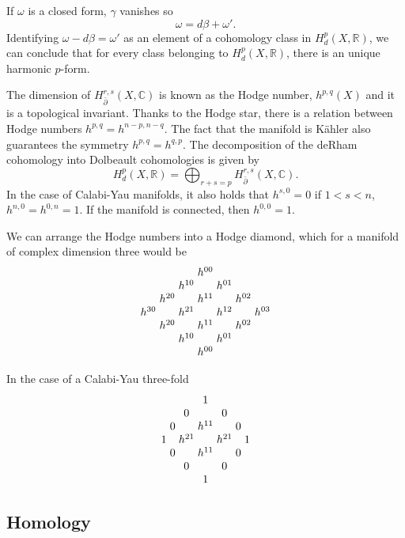 If $\omega$ is a closed form, $\gamma$ vanishes so
\begin{equation}
  \omega = d\beta + \omega'.
\end{equation}
Identifying $\omega - d\beta= \omega'$ as an element of a cohomology class in $H_d^p(X,\mathbb R)$,
we can conclude that for every class belonging to $H_d^p(X,\mathbb R)$, there is an unique
harmonic $p$-form.

The dimension of $H^{r,s}_{\bar \partial }(X,\mathbb C)$ is known as the Hodge number, $h^{p,q}(X)$ and it is a topological invariant.
Thanks to the Hodge star, there is a relation between Hodge numbers $h^{p,q}=h^{n-p,n-q}$.
The fact that the manifold is Kähler also guarantees the symmetry $h^{p,q}=h^{q,p}$.
The decomposition of the deRham cohomology into Dolbeault cohomologies is given by
\begin{equation}
  H_d^p(X,\mathbb R)=\bigoplus_{r+s=p} H_{\bar \partial}^{r,s}(X,\mathbb C).
\end{equation}
In the case of Calabi-Yau manifolds, it also holds that $h^{s,0}=0$ if $1<s<n$, $h^{n,0}=h^{0,n}=1$.
If the manifold is connected, then $h^{0,0}=1$.

We can arrange the Hodge numbers into a Hodge diamond, which for a manifold of complex dimension
three would be
{\small \[
\arraycolsep=1.5pt
\begin{array}{ccccccc}
  &&&h^{00}&&&\\
 &&h^{10}&&h^{01}&&\\
 &h^{20}&&h^{11}&&h^{02}&\\
 h^{30}&&h^{21}&&h^{12}&&h^{03}\\
 &h^{20}&&h^{11}&&h^{02}&\\
 &&h^{10}&&h^{01}&&\\
  &&&h^{00}&&&
\end{array}
\]}

In the case of a Calabi-Yau three-fold
{\small \[
\arraycolsep=1.5pt
\begin{array}{ccccccc}
  &&&1&&&\\
 &&0&&0&&\\
 &0&&h^{11}&&0&\\
 1&&h^{21}&&h^{21}&&1\\
 &0&&h^{11}&&0&\\
 &&0&&0&&\\
  &&&1&&&
\end{array}
\]}


\subsection{Homology}

